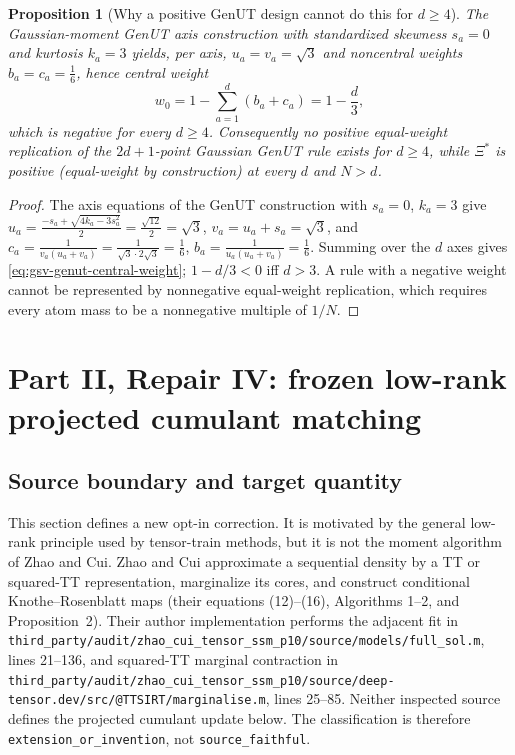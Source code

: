 \documentclass[11pt]{article}
\newtheorem{proposition}{Proposition}[section]
\theoremstyle{definition}
\theoremstyle{remark}
\begin{document}
\begin{proposition}[Why a positive GenUT design cannot do this for $d\ge4$]
\label{prop:gsv-genut-positivity}
The Gaussian-moment GenUT axis construction with standardized skewness
$s_a=0$ and kurtosis $k_a=3$ yields, per axis,
$u_a=v_a=\sqrt3$ and noncentral weights $b_a=c_a=\tfrac16$, hence central
weight
\begin{equation}
\label{eq:gsv-genut-central-weight}
 w_0=1-\sum_{a=1}^{d}(b_a+c_a)=1-\frac{d}{3},
\end{equation}
which is negative for every $d\ge4$.  Consequently no positive equal-weight
replication of the $2d{+}1$-point Gaussian GenUT rule exists for $d\ge4$,
while $\Xi^{*}$ is positive (equal-weight by construction) at every $d$ and
$N>d$.
\end{proposition}

\begin{proof}
The axis equations of the GenUT construction with $s_a=0$, $k_a=3$ give
$u_a=\tfrac{-s_a+\sqrt{4k_a-3s_a^{2}}}{2}=\tfrac{\sqrt{12}}{2}=\sqrt3$,
$v_a=u_a+s_a=\sqrt3$, and
$c_a=\frac{1}{v_a(u_a+v_a)}=\frac{1}{\sqrt3\cdot2\sqrt3}=\frac16$,
$b_a=\frac{1}{u_a(u_a+v_a)}=\frac16$.  Summing over the $d$ axes gives
\eqref{eq:gsv-genut-central-weight}; $1-d/3<0$ iff $d>3$.  A rule with a
negative weight cannot be represented by nonnegative equal-weight
replication, which requires every atom mass to be a nonnegative multiple of
$1/N$.
\end{proof}

\section{Part II, Repair IV: frozen low-rank projected cumulant matching}
\label{sec:gsv-projected-cumulants}

\subsection{Source boundary and target quantity}

This section defines a new opt-in correction.  It is motivated by the general
low-rank principle used by tensor-train methods, but it is not the moment
algorithm of Zhao and Cui.  Zhao and Cui approximate a sequential density by
a TT or squared-TT representation, marginalize its cores, and construct
conditional Knothe--Rosenblatt maps (their equations (12)--(16), Algorithms
1--2, and Proposition~2).  Their author implementation performs the adjacent
fit in
\texttt{third\_party/audit/zhao\_cui\_tensor\_ssm\_p10/source/models/full\_sol.m},
lines 21--136, and squared-TT marginal contraction in
\texttt{third\_party/audit/zhao\_cui\_tensor\_ssm\_p10/source/deep-tensor.dev/src/@TTSIRT/marginalise.m},
lines 25--85.  Neither inspected source defines the projected cumulant update
below.  The classification is therefore
\texttt{extension\_or\_invention}, not \texttt{source\_faithful}.
\end{document}
